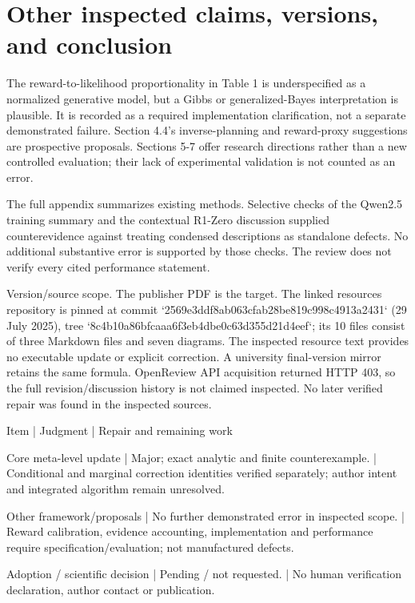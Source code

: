 \documentclass[10pt]{article}
\begin{document}
\section*{Other inspected claims, versions, and conclusion}
The reward-to-likelihood proportionality in Table 1 is underspecified as a normalized generative model, but a Gibbs or generalized-Bayes interpretation is plausible. It is recorded as a required implementation clarification, not a separate demonstrated failure. Section 4.4’s inverse-planning and reward-proxy suggestions are prospective proposals. Sections 5-7 offer research directions rather than a new controlled evaluation; their lack of experimental validation is not counted as an error.\par
The full appendix summarizes existing methods. Selective checks of the Qwen2.5 training summary and the contextual R1-Zero discussion supplied counterevidence against treating condensed descriptions as standalone defects. No additional substantive error is supported by those checks. The review does not verify every cited performance statement.\par
Version/source scope. The publisher PDF is the target. The linked resources repository is pinned at commit `2569e3ddf8ab063cfab28be819c998c4913a2431` (29 July 2025), tree `8c4b10a86bfcaaa6f3eb4dbe0c63d355d21d4eef`; its 10 files consist of three Markdown files and seven diagrams. The inspected resource text provides no executable update or explicit correction. A university final-version mirror retains the same formula. OpenReview API acquisition returned HTTP 403, so the full revision/discussion history is not claimed inspected. No later verified repair was found in the inspected sources.\par
Item | Judgment | Repair and remaining work\par
Core meta-level update | Major; exact analytic and finite counterexample. | Conditional and marginal correction identities verified separately; author intent and integrated algorithm remain unresolved.\par
Other framework/proposals | No further demonstrated error in inspected scope. | Reward calibration, evidence accounting, implementation and performance require specification/evaluation; not manufactured defects.\par
Adoption / scientific decision | Pending / not requested. | No human verification declaration, author contact or publication.\par
\end{document}
